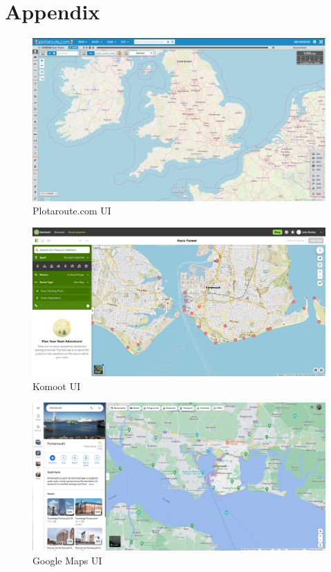 \chapter{Appendix}
\begin{figure}[!h]
    \centering
    \includegraphics[width=1\linewidth]{figures/plotarouteui.png}
    \caption{Plotaroute.com UI}
    \label{fig:plotarouteui}
\end{figure}

\begin{figure}[!h]
    \centering
    \includegraphics[width=1\linewidth]{figures/komootui.png}
    \caption{Komoot UI}
    \label{fig:komootui}
\end{figure}

\begin{figure}[!h]
    \centering
    \includegraphics[width=1\linewidth]{figures/gmapsui.png}
    \caption{Google Maps UI}
    \label{fig:gmapsui}
\end{figure}